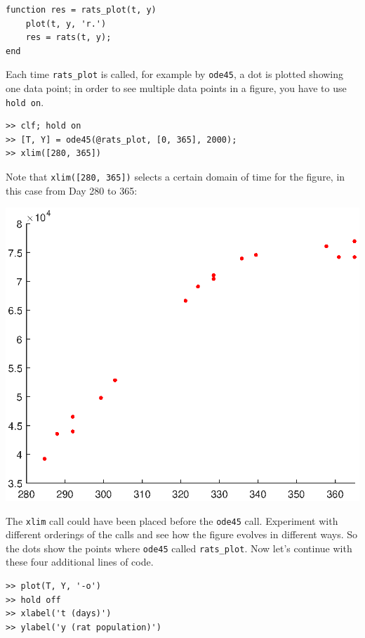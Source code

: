 \documentclass[
]{book}
\begin{document}
\begin{verbatim}
function res = rats_plot(t, y)
    plot(t, y, 'r.')
    res = rats(t, y);
end
\end{verbatim}

Each time {\tt rats\_plot} is called, for example by {\tt ode45}, a dot is plotted showing one data point; in order
to see multiple data points in a figure, you have to use {\tt hold on}.

\begin{verbatim}
>> clf; hold on
>> [T, Y] = ode45(@rats_plot, [0, 365], 2000);
>> xlim([280, 365])
\end{verbatim}

Note that {\tt xlim([280, 365])} selects a certain domain of time for the figure, in this case from Day 280 to 365:

\beforefig \centerline{\includegraphics[width=6.0in]{figs/ode45_simple.eps}}

The {\tt xlim} call could have been placed before the {\tt ode45} call.  Experiment with different orderings of the calls and see how the figure evolves in different ways.  So the dots show the points where {\tt ode45} called {\tt rats\_plot}.  Now let's continue with these four additional lines of code.

\begin{verbatim}
>> plot(T, Y, '-o')
>> hold off
>> xlabel('t (days)')
>> ylabel('y (rat population)')
\end{verbatim}
\end{document}
